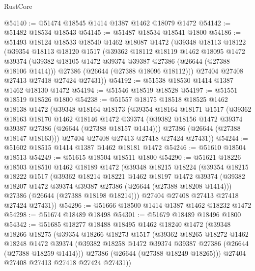 \begin{lexlean}{RustCore}
\begin{coremodule}
@54140 := @51474 @18545 @1414 @1387 @1462 @18079 @1472
@54142 := @51482 @18534 @18543
@54145 := @51487 @18534 @18541 @1800
@54186 := @51493
    @18124
    @18533
    @18540
    @1462
    @18087
    @1472
    (@39348
      @18113
      @18122
      (@39354
        @18113
        @18120
        @1517
        (@39362
          @18112
          @18119
          @1462
          @18095
          @1472
          @39374
          (@39382 @18105 @1472 @39374 @39387 @27386 (@26644 (@27388 @18106 @1414)))
          @27386
          (@26644 (@27388 @18096 @18112)))
        @27404
        @27408
        @27413
        @27418
        @27424
        @27431))
@54192 := @51538 @18530 @1414 @1387 @1462 @18130 @1472
@54194 := @51546 @18519 @18528
@54197 := @51551 @18519 @18526 @1800
@54238 := @51557
    @18175
    @18518
    @18525
    @1462
    @18138
    @1472
    (@39348
      @18164
      @18173
      (@39354
        @18164
        @18171
        @1517
        (@39362
          @18163
          @18170
          @1462
          @18146
          @1472
          @39374
          (@39382 @18156 @1472 @39374 @39387 @27386 (@26644 (@27388 @18157 @1414)))
          @27386
          (@26644 (@27388 @18147 @18163)))
        @27404
        @27408
        @27413
        @27418
        @27424
        @27431))
@54244 := @51602 @18515 @1414 @1387 @1462 @18181 @1472
@54246 := @51610 @18504 @18513
@54249 := @51615 @18504 @18511 @1800
@54290 := @51621
    @18226
    @18503
    @18510
    @1462
    @18189
    @1472
    (@39348
      @18215
      @18224
      (@39354
        @18215
        @18222
        @1517
        (@39362
          @18214
          @18221
          @1462
          @18197
          @1472
          @39374
          (@39382 @18207 @1472 @39374 @39387 @27386 (@26644 (@27388 @18208 @1414)))
          @27386
          (@26644 (@27388 @18198 @18214)))
        @27404
        @27408
        @27413
        @27418
        @27424
        @27431))
@54296 := @51666 @18500 @1414 @1387 @1462 @18232 @1472
@54298 := @51674 @18489 @18498
@54301 := @51679 @18489 @18496 @1800
@54342 := @51685
    @18277
    @18488
    @18495
    @1462
    @18240
    @1472
    (@39348
      @18266
      @18275
      (@39354
        @18266
        @18273
        @1517
        (@39362
          @18265
          @18272
          @1462
          @18248
          @1472
          @39374
          (@39382 @18258 @1472 @39374 @39387 @27386 (@26644 (@27388 @18259 @1414)))
          @27386
          (@26644 (@27388 @18249 @18265)))
        @27404
        @27408
        @27413
        @27418
        @27424
        @27431))

\end{coremodule}
\end{lexlean}
